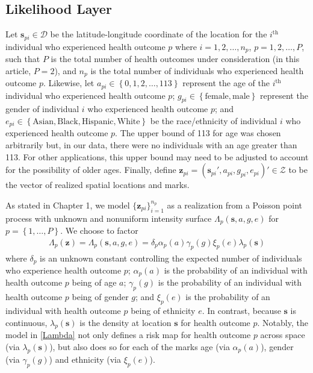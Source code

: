 \documentclass[final]{statsoc}
\begin{document}
\subsection{Likelihood Layer}\label{likelayer}
Let $\mathbf{s}_{pi} \in \mathcal{D}$ be the latitude-longitude coordinate
of the location for the $i^{\text{th}}$ 
individual who experienced health outcome $p$ where $i=1,2,\dots,n_p$, $p=1,2,\dots,P$, 
such that $P$ is the total number of health outcomes under consideration (in this article, $P=2$),
and $n_p$ is the total number of individuals who experienced health outcome $p$.
Likewise, let $a_{pi} \in \left\{0,1,2,\dots,113\right\}$ represent the age of the $i^{\text{th}}$ individual who
experienced health outcome $p$; 
$g_{pi} \in \left\{\text{female}, \text{male}\right\}$ represent the gender of individual $i$ who experienced health 
outcome $p$; and $e_{pi} \in \left\{\text{Asian}, \text{Black}, \text{Hispanic}, 
\text{White}\right\}$ be the race/ethnicity of individual $i$ who experienced health
outcome $p$. The upper bound of 113 for age was chosen arbitrarily but, in our data, 
there were no individuals with an age greater than 113. For other applications, this upper 
bound may need to be adjusted to account for the possibility of older ages. 
Finally, define $\mathbf{z}_{pi} = (\mathbf{s}_{pi}',a_{pi},g_{pi},e_{pi})' \in 
\mathcal{Z}$ to be the vector of realized spatial locations and marks.

As stated in Chapter 1, we model $\{\mathbf{z}_{pi}\}_{i=1}^{n_p}$ as a
realization from a Poisson point process with unknown and nonuniform intensity surface
$\Lambda_{p}(\mathbf{s}, a, g, e)$ for $p=\left\{1, \dots, P\right\}$.  We choose to factor 
\begin{align}
\Lambda_p(\mathbf{z}) = \Lambda_p(\mathbf{s}, a, g, e) = \delta_p\alpha_p(a)\gamma_p(g)\xi_p(e)
\lambda_p(\mathbf{s})
\label{Lambda}
\end{align}
where $\delta_p$ is an unknown constant controlling the 
expected number of individuals who experience health outcome $p$; 
$\alpha_p(a)$ is the probability of an individual with health outcome 
$p$ being of age $a$; $\gamma_p(g)$ is the probability of an individual with health
outcome $p$ being of gender $g$; and $\xi_p(e)$ is the probability of an individual 
with health outcome $p$ being of ethnicity $e$. In contrast, because $\mathbf{s}$ is 
continuous, $\lambda_p(\mathbf{s})$ 
is the density at location $\mathbf{s}$ for health outcome $p$. Notably, the model in 
\eqref{Lambda} not only defines a risk map for health outcome $p$ across space 
(via $\lambda_p(\mathbf{s})$), but also does so for each of the marks age 
(via $\alpha_p(a)$), gender (via $\gamma_p(g)$) and ethnicity (via $\xi_p(e)$).
\end{document}
